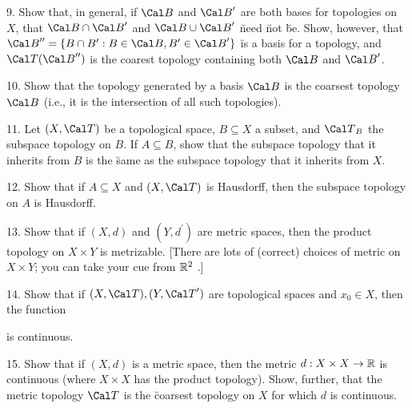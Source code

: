 \ssk

\item{9.} Show that, in general, if ${\Cal B}$ and ${\Cal B}^\prime$ are both bases for topologies 
on $X$, that
${\Cal B}\cap{\Cal B}^\prime$ and ${\Cal B}\cup{\Cal B}^\prime$ \u{need} \u{not} \u{be}. Show,
however, that ${\Cal B}^{\prime\prime} = \{B\cap B^\prime : B\in {\Cal B}, B^\prime \in{\Cal B}^\prime \}$
\u{is} a basis for a topology, and ${\Cal T}({\Cal B}^{\prime\prime})$ is the coarest topology containing both 
${\Cal B}$ and ${\Cal B}^\prime$.

\ssk

\item{10.} Show that the topology generated by a basis $\Cal B$ is the coarsest topology 
$\Cal B$ (i.e., it is the intersection of all such topologies).

\ssk

\item{11.} Let $(X,{\Cal T})$ be a topological space, $B\subseteq X$ a subset, and 
${\Cal T}_B$ the subspace topology on $B$. If $A\subseteq B$, show that the subspace
topology that it inherits from $B$ is the \u{same} as the subspace topology that it
inherits from $X$.

\ssk

\item{12.} Show that if $A\subseteq X$ and $(X,{\Cal T})$ is Hausdorff, then the
subspace topology on $A$ is Hausdorff.

\ssk

\item{13.} Show that if $(X,d)$ and $(Y,d^\prime)$ are metric spaces, then the product
topology on $X\times Y$ is metrizable. [There are lots of (correct) choices of metric on 
$X\times Y$; you can take your cue from ${\Bbb R}^2$ .]

\ssk

\item{14.} Show that if $(X,{\Cal T}), (Y,{\Cal T}^\prime)$ are topological spaces and $x_0\in X$, then
the function 

\ssk


\ssk

\item{} is continuous.

\ssk

\item{15.} Show that if $(X,d)$ is a metric space, then the metric $d : X\times X\rightarrow 
{\Bbb R}$ is continuous (where $X\times X$ has the product topology). Show, further, that
the metric topology ${\Cal T}$ is the \u{coarsest} topology on $X$ for which $d$ is continuous.

